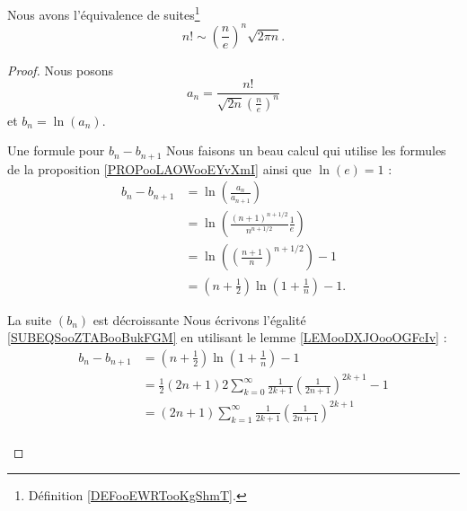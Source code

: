 \begin{lemma}        \label{LemCEoBqrP}
	Nous avons l'équivalence de suites\footnote{Définition \ref{DEFooEWRTooKgShmT}.}
	\begin{equation}
		n!\sim \left( \frac{ n }{ e } \right)^n\sqrt{2\pi n}.
	\end{equation}
\end{lemma}

\begin{proof}
	Nous posons
	\begin{equation}
		a_n=\frac{ n! }{ \sqrt{ 2n } \left( \frac{ n }{ e } \right)^n }
	\end{equation}
	et \( b_n=\ln(a_n)\).
	\begin{subproof}
		\item[Une formule pour \( b_n-b_{n+1}\)]
		Nous faisons un beau calcul qui utilise les formules de la proposition \ref{PROPooLAOWooEYvXmI} ainsi que \( \ln(e)=1\) :
		\begin{subequations}        \label{SUBEQSooZTABooBukFGM}
			\begin{align}
				b_n-b_{n+1} & =\ln\left( \frac{ a_n }{ a_{n+1} } \right)                                 \\
				            & =\ln\left(     \frac{ (n+1)^{n+1/2} }{ n^{n+1/2} }\frac{1}{ e }    \right) \\
				            & =\ln\left( (\frac{ n+1 }{ n })^{n+1/2} \right)-1                           \\
				            & =\left( n+\frac{1}{ 2 } \right)\ln(1+\frac{1}{ n })-1.
			\end{align}
		\end{subequations}
		\item[La suite \( (b_n)\) est décroissante]
		Nous écrivons l'égalité \eqref{SUBEQSooZTABooBukFGM} en utilisant le lemme \ref{LEMooDXJOooOGFcIv} :
		\begin{subequations}
			\begin{align}
				b_n-b_{n+1} & =(n+\frac{ 1 }{2})\ln(1+\frac{1}{ n })-1                                                         \\
				            & =\frac{ 1 }{2}(2n+1)2\sum_{k=0}^{\infty}\frac{1}{ 2k+1 }\left( \frac{1}{ 2n+1 } \right)^{2k+1}-1 \\
				            & =(2n+1)\sum_{k=1}^{\infty}\frac{1}{ 2k+1 }\left( \frac{1}{ 2n+1 } \right)^{2k+1}                 \\

\end{align}
\end{subequations}
\end{subproof}
\end{proof}

